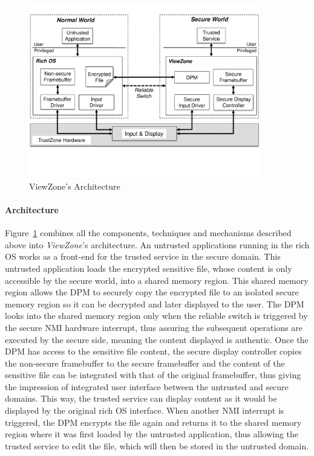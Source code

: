 
\begin{figure}[t!]
	\centering
	\includegraphics[width=0.9\textwidth]{img/viewzone_architecture.pdf}
	\caption{ViewZone's Architecture}
	\label{fig:viewzone_architecture}
\end{figure}

\paragraph{\textbf{Architecture}} Figure~\ref{fig:viewzone_architecture} combines all the components, techniques and mechanisms described above into \emph{ViewZone}'s architecture. An untrusted applications running in the rich OS works as a front-end for the trusted service in the secure domain. This untrusted application loads the encrypted sensitive file, whose content is only accessible by the secure world, into a shared memory region. This shared memory region allows the \ac{DPM} to securely copy the encrypted file to an isolated secure memory region so it can be decrypted and later displayed to the user. The \ac{DPM} looks into the shared memory region only when the reliable switch is triggered by the secure \ac{NMI} hardware interrupt, thus assuring the subsequent operations are executed by the secure side, meaning the content displayed is authentic. Once the \ac{DPM} has access to the sensitive file content, the secure display controller copies the non-secure framebuffer to the secure framebuffer and the content of the sensitive file can be integrated with that of the original framebuffer, thus giving the impression of integrated user interface between the untrusted and secure domains. This way, the trusted service can display content as it would be displayed by the original rich OS interface. When another \ac{NMI} interrupt is triggered, the \ac{DPM} encrypts the file again and returns it to the shared memory region where it was first loaded by the untrusted application, thus allowing the trusted service to edit the file, which will then be stored in the untrusted domain.